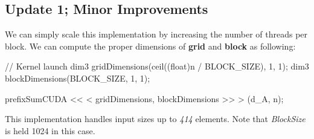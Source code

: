 \documentclass[12pt]{article}
\numberwithin{equation}{section}
\numberwithin{table}{section}
\numberwithin{figure}{section}
\begin{document}
\subsection{Update 1; Minor Improvements}
We can simply scale this implementation by increasing the number of threads per block. We can compute the proper dimensions of \textbf{grid} and \textbf{block} as following:
\begin{cpp}
	// Kernel launch 
	dim3 gridDimensions(ceil((float)n / BLOCK_SIZE), 1, 1);
	dim3 blockDimensions(BLOCK_SIZE, 1, 1);
	
	prefixSumCUDA << < gridDimensions, blockDimensions >> > (d_A, n);
\end{cpp}
This implementation handles input sizes up to \textit{414} elements. Note that \textit{BlockSize} is held 1024 in this case.
\end{document}
